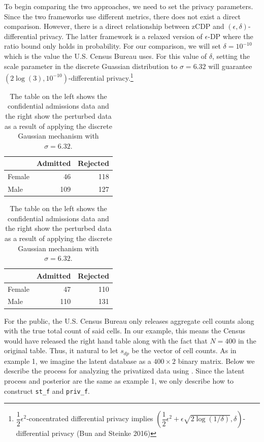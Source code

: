 To begin comparing the two approaches, we need to set the privacy parameters.
Since the two frameworks use different metrics, there does not exist
a direct comparison. However, there is a direct relationship between
zCDP and \((\epsilon, \delta)\)-differential privacy. The latter framework
is a relaxed version of \(\epsilon\)-DP where the ratio bound only holds
in probability. For our comparison, we will set \(\delta = 10^{-10}\) which
is the value the U.S. Census Bureau uses.
For this value of \(\delta\), setting the scale parameter in the discrete Guassian
distribution to \(\sigma = 6.32\) will guarantee \((2\log(3), 10^{-10})\)-differential privacy.\footnote{\(\dfrac{1}{2} \epsilon^2\)-concentrated differential privacy implies \(\left(\dfrac{1}{2}\epsilon^2 + \epsilon \sqrt{2\log(1/\delta)}, \delta\right)\)-differential privacy (Bun and Steinke 2016)}

\begin{table}[!h]
\centering
\centering
\begin{tabular}[t]{lrr}
\toprule
  & Admitted & Rejected\\
\midrule
Female & 46 & 118\\
Male & 109 & 127\\
\bottomrule
\end{tabular}
\centering
\begin{tabular}[t]{lrr}
\toprule
  & Admitted & Rejected\\
\midrule
Female & 47 & 110\\
Male & 110 & 131\\
\bottomrule
\end{tabular}
\caption{The table on the left shows the confidential admissions data and the right show the perturbed data as a result of applying the discrete Gaussian mechanism with $\sigma = 6.32$.}
\end{table}

For the public, the U.S. Census Bureau only releases aggregate cell counts along with
the true total count of said cells. In our example,
this means the Census would have released the right hand
table along with the fact that \(N = 400\) in the original
table. Thus, it natural to let \(s_{dp}\) be the vector of cell counts. As in
example 1, we imagine the latent database as a
\(400 \times 2\) binary matrix. Below
we describe the process for analyzing the privatized
data using . Since the latent process
and posterior are the same as example 1, we only describe
how to construct \texttt{st\_f} and \texttt{priv\_f}.

